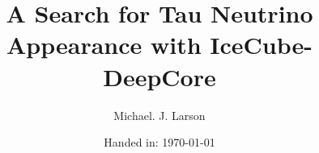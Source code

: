 \documentclass[11pt,a4paper,titlepage,twoside]{scrreprt}
\author{Michael. J. Larson}
\title{A Search for Tau Neutrino Appearance with IceCube-DeepCore}
\subtitle{}
\date{Handed in: \today}
\begin{document}
\maketitle

\tableofcontents

\listoffigures

\listoftables

\graphicspath{{chapters/introduction/images/}}
\label{chapter:introduction}


\graphicspath{{chapters/oscillations/images/}}
\label{chapter:oscillations}


\graphicspath{{chapters/detector/images/}}
\label{chapter:detector}


\graphicspath{{chapters/simulation/images/}}
\label{chapter:simulation}


\graphicspath{{chapters/vuvuzela/images/}}
\label{chapter:vuvuzela}


\graphicspath{{chapters/muonsim/images/}}
\label{chapter:muonsim}


\graphicspath{{chapters/greco/images/}}
\label{chapter:greco}


\graphicspath{{chapters/analysis/images/}}
\label{chapter:analysis}


%

\printbibliography

\listoftodos[Notes]
\end{document}
